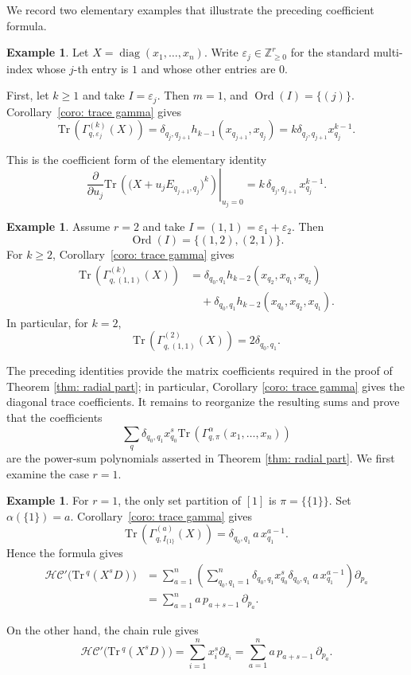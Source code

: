 \documentclass[11pt,reqno]{amsart}
\theoremstyle{definition}
\newtheorem{example}[theorem]{Example}
\newcommand{\bbZ}{\mathbb{Z}}
\newcommand{\Tr}{\mathrm{Tr} \,}
\newcommand{\hc}{\mathcal{HC}}
\newcommand{\Ord}{\operatorname{Ord}}
\begin{document}
We record two elementary examples that illustrate the preceding coefficient formula.

\begin{example}
Let \(X=\operatorname{diag}(x_1,\dots,x_n)\).  Write
\(\varepsilon_j\in\bbZ_{\geq 0}^r\) for the standard multi-index whose
\(j\)-th entry is \(1\) and whose other entries are \(0\).

First, let \(k\geq1\) and take \(I=\varepsilon_j\).  Then \(m=1\), and
\(\Ord(I)=\{(j)\}\).  Corollary~\ref{coro: trace gamma} gives
\[
\Tr \left(
\Gamma_{q,\varepsilon_j}^{(k)}(X)
\right)
=
\delta_{q_j,q_{j+1}}
h_{k-1}(x_{q_{j+1}},x_{q_j})
=
k\delta_{q_j,q_{j+1}}x_{q_j}^{k-1}.
\]

This is the coefficient form of the elementary identity
\[
   \left.
\frac{\partial}{\partial u_j}
\Tr\!\left(
\bigl(X+u_jE_{q_{j+1},q_j}\bigr)^k
\right)
\right|_{u_j=0}
   =
   k\,\delta_{q_{j},q_{j+1}}\,x_{q_j}^{k-1}.
\]
\end{example}




\begin{example}
Assume \(r=2\) and take
\(I=(1,1)=\varepsilon_1+\varepsilon_2\).  Then
\[
   \Ord(I)=\{(1,2),(2,1)\}.
\]
For \(k\geq 2\), Corollary~\ref{coro: trace gamma} gives
\[
\begin{aligned}
\Tr \left(
\Gamma_{q,(1,1)}^{(k)}(X)
\right)
&=
\delta_{q_0,q_1}
h_{k-2}(x_{q_2},x_{q_1},x_{q_2})
\\
&\quad+
\delta_{q_0,q_1}
h_{k-2}(x_{q_0},x_{q_2},x_{q_1}).
\end{aligned}
\]
In particular, for \(k=2\),
\[
	\Tr \left(
		\Gamma_{q,(1,1)}^{(2)}(X)
		\right)
		=
		2\delta_{q_0,q_1}.
\]
\end{example}


The preceding identities provide the matrix coefficients required in the proof of Theorem \ref{thm: radial part}; in particular, Corollary \ref{coro: trace gamma} gives the diagonal trace coefficients. It remains to reorganize the resulting sums and prove that the coefficients
\[
\sum_q {\delta_{q_0, q_1}}x_{q_0}^s
\Tr(\Gamma_{q,\pi}^{\alpha}(x_1,\dots,x_n))
\]
are the power-sum polynomials asserted in Theorem \ref{thm: radial part}.  We first examine the case \(r=1\).


\begin{example}
For \(r=1\), the only set partition of \([1]\) is
\(\pi=\{\{1\}\}\).
Set \(\alpha(\{1\})=a\).
Corollary~\ref{coro: trace gamma}
gives
\[
   \Tr\left(\Gamma_{q,I_{\{1\}}}^{(a)}(X)\right)
   =
   \delta_{q_0,q_1}\,a\,x_{q_1}^{a-1}.
\]
Hence the formula gives
\[
\begin{aligned}
   \hc'\bigl(\Tr^q(X^sD)\bigr)
   &=
   \sum_{a=1}^n
   \left(
      \sum_{q_0,q_1=1}^n
      \delta_{q_0,q_1}x_{q_0}^s
      \delta_{q_0,q_1}\,a\,x_{q_1}^{a-1}
   \right)
   \partial_{p_a}  \\
   &=
   \sum_{a=1}^n
   a\,p_{a+s-1}\,\partial_{p_a}.
\end{aligned}
\]

On the other hand, the chain rule gives
\[
   \hc'\bigl(\Tr^q(X^sD)\bigr)
   =
   {\sum_{i=1}^n x_i^s\partial_{x_i}}
   =
   \sum_{a=1}^n
   a\,p_{a+s-1}\,\partial_{p_a}.
\]
\end{example}
\end{document}
